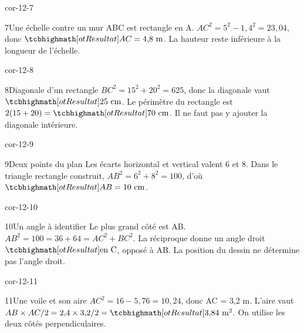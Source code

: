 \begin{blocLivre}{cor-12-7}\begin{corrige}{7}{Une échelle contre un mur}
ABC est rectangle en A. $AC^2=5^2-1{,}4^2=23{,}04$, donc $\res{AC=4{,}8\text{ m}}$. La hauteur reste inférieure à la longueur de l’échelle.
\label{fig-cor-12-7}
\end{corrige}\end{blocLivre}
\begin{blocLivre}{cor-12-8}\begin{corrige}{8}{Diagonale d’un rectangle}
$BC^2=15^2+20^2=625$, donc la diagonale vaut $\res{25\text{ cm}}$. Le périmètre du rectangle est $2(15+20)=\res{70\text{ cm}}$. Il ne faut pas y ajouter la diagonale intérieure.
\label{fig-cor-12-8}
\end{corrige}\end{blocLivre}
\begin{blocLivre}{cor-12-9}\begin{corrige}{9}{Deux points du plan}
Les écarts horizontal et vertical valent 6 et 8. Dans le triangle rectangle construit, $AB^2=6^2+8^2=100$, d’où $\res{AB=10\text{ cm}}$.
\label{fig-cor-12-9}
\end{corrige}\end{blocLivre}
\begin{blocLivre}{cor-12-10}\begin{corrige}{10}{Un angle à identifier}
Le plus grand côté est AB. $AB^2=100=36+64=AC^2+BC^2$. La réciproque donne un angle droit $\res{\text{en C}}$, opposé à AB. La position du dessin ne détermine pas l’angle droit.
\label{fig-cor-12-10}
\end{corrige}\end{blocLivre}
\begin{blocLivre}{cor-12-11}\begin{corrige}{11}{Une voile et son aire}
$AC^2=16-5{,}76=10{,}24$, donc AC = 3,2 m. L’aire vaut $AB\times AC/2=2{,}4\times3{,}2/2=\res{3{,}84\text{ m}^2}$. On utilise les deux côtés perpendiculaires.
\label{fig-cor-12-11}
\end{corrige}\end{blocLivre}
